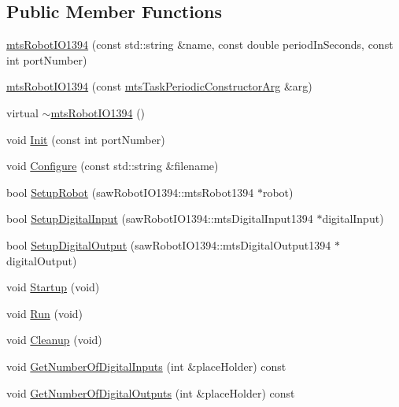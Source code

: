 \subsection*{Public Member Functions}
\begin{DoxyCompactItemize}
\item 
\hyperlink{classmts_robot_i_o1394_af6ccb3f5933a035c80f1d58ad24d5be8}{mts\-Robot\-I\-O1394} (const std\-::string \&name, const double period\-In\-Seconds, const int port\-Number)
\item 
\hyperlink{classmts_robot_i_o1394_a99cca8cfc575891d365ce310f984be99}{mts\-Robot\-I\-O1394} (const \hyperlink{classmts_task_periodic_constructor_arg}{mts\-Task\-Periodic\-Constructor\-Arg} \&arg)
\item 
virtual \hyperlink{classmts_robot_i_o1394_a0b6641e7214766380c3a786e5d264101}{$\sim$mts\-Robot\-I\-O1394} ()
\item 
void \hyperlink{classmts_robot_i_o1394_a1676ac5cfce75e2bc97dbfd03f8ff121}{Init} (const int port\-Number)
\item 
void \hyperlink{classmts_robot_i_o1394_a306c3ced635583f7d0e197e0fd6118cb}{Configure} (const std\-::string \&filename)
\item 
bool \hyperlink{classmts_robot_i_o1394_acc8de15da51c663bd402c13958693b0e}{Setup\-Robot} (saw\-Robot\-I\-O1394\-::mts\-Robot1394 $\ast$robot)
\item 
bool \hyperlink{classmts_robot_i_o1394_af5a72252e919132a32cc2b800508bf16}{Setup\-Digital\-Input} (saw\-Robot\-I\-O1394\-::mts\-Digital\-Input1394 $\ast$digital\-Input)
\item 
bool \hyperlink{classmts_robot_i_o1394_a41e0f96eb8d1fd517f61320487fe8fed}{Setup\-Digital\-Output} (saw\-Robot\-I\-O1394\-::mts\-Digital\-Output1394 $\ast$digital\-Output)
\item 
void \hyperlink{classmts_robot_i_o1394_acd53cbdb68ee67bdc55da6312a407043}{Startup} (void)
\item 
void \hyperlink{classmts_robot_i_o1394_a01fea2cc930d89b666f603b27eed61ba}{Run} (void)
\item 
void \hyperlink{classmts_robot_i_o1394_a0ffa72f9f6d3c23d19cb592f325f8e39}{Cleanup} (void)
\item 
void \hyperlink{classmts_robot_i_o1394_a46df5d7d8527d73c5fdd40806899fbdb}{Get\-Number\-Of\-Digital\-Inputs} (int \&place\-Holder) const 
\item 
void \hyperlink{classmts_robot_i_o1394_ad6816a5ed494d9e42a271ee6d1174a49}{Get\-Number\-Of\-Digital\-Outputs} (int \&place\-Holder) const 
\end{DoxyCompactItemize}
